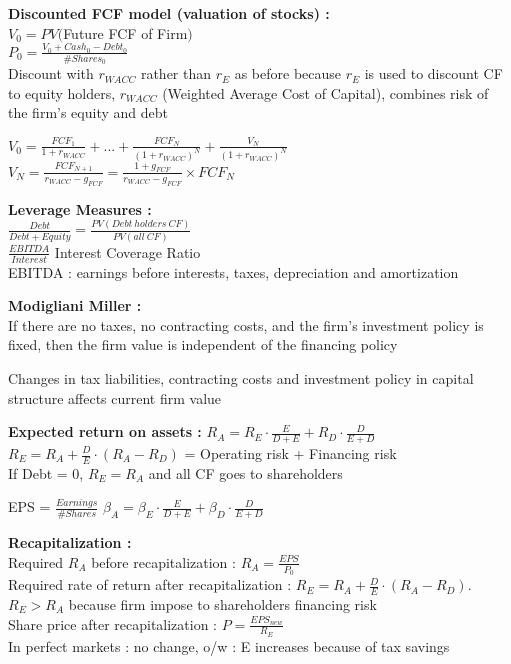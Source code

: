 \documentclass[a4paper,twocolumn]{article}
\begin{document}
\textbf{Discounted FCF model (valuation of stocks) :}\\
$V_0 = PV($Future FCF of Firm$)$\\
$P_0 = \frac{V_0 + Cash_0 - Debt_0}{\#Shares_0}$\\
Discount with $r_{WACC}$ rather than $r_E$ as before because $r_E$ is used to discount CF to equity holders, $r_{WACC}$ (Weighted Average Cost of Capital), combines risk of the firm's equity and debt

$V_0 = \frac{FCF_1}{1+r_{WACC}} + ... + \frac{FCF_N}{(1+r_{WACC})^N} + \frac{V_N}{(1+r_{WACC})^N}$\\
$V_N = \frac{FCF_{N+1}}{r_{WACC}-g_{FCF}} = \frac{1+g_{FCF}}{r_{WACC}-g_{FCF}}\times FCF_N$

\textbf{Leverage Measures :}\\
$\frac{Debt}{Debt+Equity} = \frac{PV(Debt\ holders\ CF)}{PV(all\ CF)}$\\
$\frac{EBITDA}{Interest}$ Interest Coverage Ratio\\
EBITDA : earnings before interests, taxes, depreciation and amortization

\textbf{Modigliani Miller :}\\
If there are no taxes, no contracting costs, and the firm's investment policy is fixed, then the firm value is independent of the financing policy

Changes in tax liabilities, contracting costs and investment policy in capital structure affects current firm value

\textbf{Expected return on assets :} $R_A = R_E \cdot \frac{E}{D+E} + R_D \cdot \frac{D}{E+D}$\\
$R_E = R_A + \frac{D}{E}\cdot (R_A-R_D)$ = Operating risk + Financing risk\\
If Debt = 0, $R_E = R_A$ and all CF goes to shareholders

EPS = $\frac{Earnings}{\#Shares}$ \hspace{0.5cm} $\beta_A = \beta_E \cdot \frac{E}{D+E} + \beta_D \cdot \frac{D}{E+D}$

\textbf{Recapitalization :}\\
Required $R_A$ before recapitalization : $R_A = \frac{EPS}{P_0}$\\
Required rate of return after recapitalization : $R_E = R_A + \frac{D}{E}\cdot (R_A-R_D)$. $R_E > R_A$ because firm impose to shareholders financing risk\\
Share price after recapitalization : $P = \frac{EPS_{new}}{R_E}$\\
In perfect markets : no change, o/w : E increases because of tax savings
\end{document}
